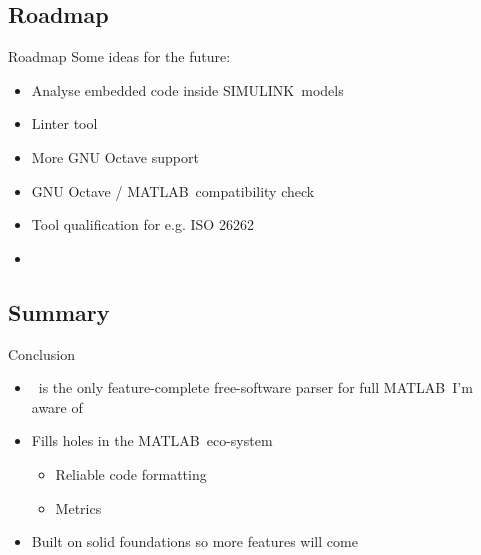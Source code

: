 \documentclass{beamer}
\newcommand{\mh}[0]{{\sc\structure{Miss\_Hit}}}
\begin{document}
\subsection{Roadmap}
\begin{frame}{Roadmap}
  Some ideas for the future:
  \begin{itemize}
  \item Analyse embedded code inside SIMULINK\texttrademark\ models
  \item Linter tool
  \item More GNU Octave support
  \item GNU Octave / MATLAB\texttrademark\ compatibility check
  \item Tool qualification for e.g. ISO 26262
    \pause
  \item {}
  \end{itemize}
\end{frame}

\subsection{Summary}
\begin{frame}{Conclusion}
  \begin{itemize}
  \item \mh~is the only feature-complete free-software parser for full
    MATLAB\texttrademark\ I'm aware of
  \item Fills holes in the MATLAB\texttrademark\ eco-system
    \begin{itemize}
    \item Reliable code formatting
    \item Metrics
    \end{itemize}
  \item Built on solid foundations so more features will come
  \end{itemize}

  \vspace{12pt}

\end{frame}
\end{document}
